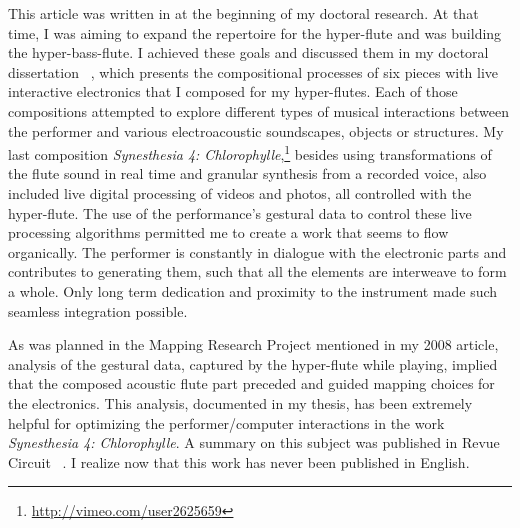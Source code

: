 



This article was written in at the beginning of my doctoral research. At that time, I was aiming to expand the repertoire for the hyper-flute and was building the hyper-bass-flute. I achieved these goals and discussed them in my doctoral dissertation~ \cite{Palacio-Quintin:2011}, which presents the compositional processes of six pieces with live interactive electronics that I composed for my hyper-flutes. Each of those compositions attempted to explore different types of musical interactions between the performer and various electroacoustic soundscapes, objects or structures. My last composition \emph{Synesthesia 4: Chlorophylle},\footnote{\url{http://vimeo.com/user2625659}} besides using transformations of the flute sound in real time and granular synthesis from a recorded voice, also included live digital processing of videos and photos, all controlled with the hyper-flute. The use of the performance's gestural data to control these live processing algorithms permitted me to create a work that seems to flow organically. The performer is constantly in dialogue with the electronic parts and contributes to generating them, such that all the elements are interweave to form a whole. Only long term dedication and proximity to the instrument made such seamless integration possible.

As was planned in the Mapping Research Project mentioned in my 2008 article, analysis of the gestural data, captured by the hyper-flute while playing, implied that the composed acoustic flute part preceded and guided mapping choices for the electronics. This analysis, documented in my thesis, has been extremely helpful for optimizing the performer/computer interactions in the work \emph{Synesthesia 4: Chlorophylle}. A summary on this subject was published in Revue Circuit~ \cite{Palacio-Quintin:2012}. I realize now that this work has never been published in English.

